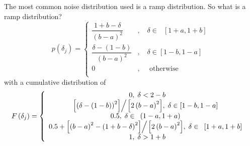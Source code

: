\documentclass[]{article}
\begin{document}
The most common noise distribution used is a ramp distribution. So what
is a ramp distribution? \[
    p\left( {\delta _{j}}\right) =\left\{ {{
            \begin{array}{ccl} 
            \dfrac{ {1+ b - \delta } }{\left( {b - a} \right)^2}
                    &,&\;\delta \in \mbox{ }\left[ {1+a,1+b} \right] \\ 
                \dfrac{ {\delta - (1 - b)} }{\left( {b - a} \right)^2} 
                &,&\;\delta \in \left[ {1 - b,1 - a} \right] \\ 
                0&,&\;\mbox{ otherwise } \\
                 \end{array}
        }}\right. 
\] with a cumulative distribution of \[
        F\left( {\delta _{j}}\right) =\left\{ {{
                \begin{array}{*{20}c}
                {\mbox{0},\;\delta < {2-b} } \\ 
                {{\left[ {\left( {\delta - (1-b)} \right)^2} \right]} 
                  {\left/ {\vphantom {{\left[ {\left( {\delta - (1-b)} \right)^2} \right]} 
                  {\left[ {2\left( {b - a} \right)^2} \right]}}} \right. } {\left[ {2\left( {b - a} \right)^2} \right]},\;\delta \in \left[ {1 - b,1 - a} \right]\mbox{ }} \\
                  {\mbox{0.5}, \;\delta \in \mbox{ }\left( {1-a,1+a} \right)\mbox{ }} \\
                  {\mbox{0.5} + {\left[ {\left( {b - a} \right)^2 - \left( {1+b - \delta } \right)^2} \right]}
                  {\left/ {\vphantom {{\left[ {\left( {b - a} \right)^2 - \left( {1+b - \delta } \right)^2} \right]}
                  {\left[ {2\left( {b - a} \right)^2} \right]}}} \right. } {\left[ {2\left( {b - a} \right)^2} \right]},\;\delta \in \mbox{ }\left[ {1+a,1+b} \right]\mbox{ 
                    }} \\ 
                    {\mbox{1}, \;\delta > {1+b} } \\ \end{array}}}\right. 
\]
\end{document}
